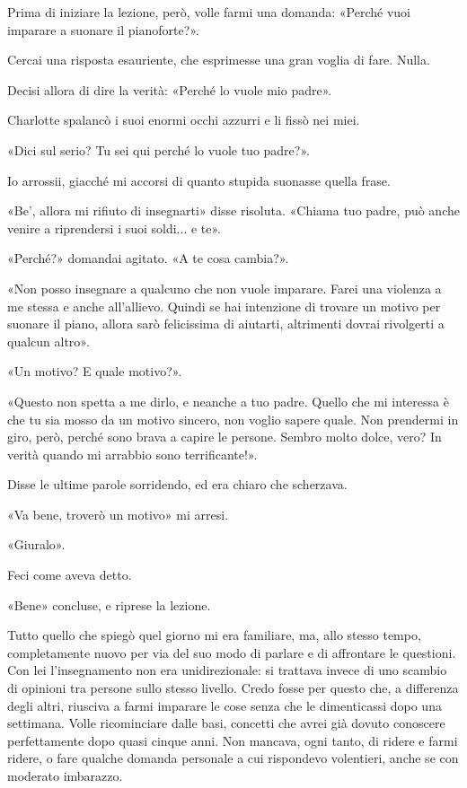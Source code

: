 \documentclass[a4paper,11pt,oneside,openright,final]{memoir}
\begin{document}
Prima di iniziare la lezione, però, volle farmi una domanda: «Perché vuoi
imparare a suonare il pianoforte?».

Cercai una risposta esauriente, che esprimesse una gran voglia di fare. Nulla.

Decisi allora di dire la verità: «Perché lo vuole mio padre».

Charlotte spalancò i suoi enormi occhi azzurri e li fissò nei miei.

«Dici sul serio? Tu sei qui perché lo vuole tuo padre?».

Io arrossii, giacché mi accorsi di quanto stupida suonasse quella frase.

«Be', allora mi rifiuto di insegnarti» disse risoluta. «Chiama tuo padre, può
anche venire a riprendersi i suoi soldi... e te».

«Perché?» domandai agitato. «A te cosa cambia?».

«Non posso insegnare a qualcuno che non vuole imparare. Farei una violenza a me
stessa e anche all'allievo. Quindi se hai intenzione di trovare un motivo per
suonare il piano, allora sarò felicissima di aiutarti, altrimenti dovrai
rivolgerti a qualcun altro».

«Un motivo? E quale motivo?».

«Questo non spetta a me dirlo, e neanche a tuo padre. Quello che mi interessa è
che tu sia mosso da un motivo sincero, non voglio sapere quale. Non prendermi in
giro, però, perché sono brava a capire le persone. Sembro molto dolce, vero? In
verità quando mi arrabbio sono terrificante!».

Disse le ultime parole sorridendo, ed era chiaro che scherzava.

«Va bene, troverò un motivo» mi arresi.

«Giuralo».

Feci come aveva detto.

«Bene» concluse, e riprese la lezione.

Tutto quello che spiegò quel giorno mi era familiare, ma, allo stesso tempo,
completamente nuovo per via del suo modo di parlare e di affrontare le
questioni. Con lei l'insegnamento non era unidirezionale: si trattava invece di
uno scambio di opinioni tra persone sullo stesso livello. Credo fosse per questo
che, a differenza degli altri, riusciva a farmi imparare le cose senza che le
dimenticassi dopo una settimana. Volle ricominciare dalle basi, concetti che
avrei già dovuto conoscere perfettamente dopo quasi cinque anni. Non mancava,
ogni tanto, di ridere e farmi ridere, o fare qualche domanda personale a cui
rispondevo volentieri, anche se con moderato imbarazzo.
\end{document}
